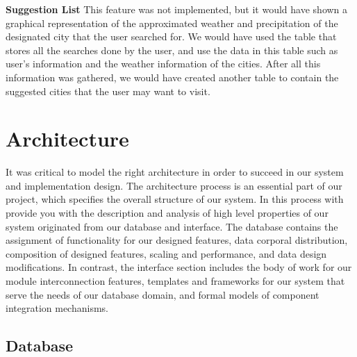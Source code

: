 \documentclass{sig-alternate}
\begin{document}
		\textbf{Suggestion List}\newline
		This feature was not implemented, but it would have shown a graphical representation of the 				approximated weather and precipitation of the designated city that the user searched for. We 				would have used the table that stores all the searches done by the user, and use the data in 				this table such as user's information and the weather information of the cities. After all this 			information was gathered, we would have created another table to contain the suggested cities 			that the user may want to visit. \newline
		
\section{Architecture}
	\label{architecture}

	It was critical to model the right architecture in order to succeed in our system and implementation 	design. The architecture process is an essential part of our project, which specifies the overall 		structure of our system. In this process with provide you with the description and analysis of high 		level properties of our system originated from our database and interface. The database contains the 	assignment of functionality for our designed features, data corporal distribution, composition of 		designed features, scaling and performance, and data design modifications. In contrast, the 				interface section includes the body of work for our module interconnection features, templates and 		frameworks for our system that serve the needs of our database domain, and formal models of 				component integration mechanisms. \newline
	
	\subsection*{Database}
	
\end{document}
